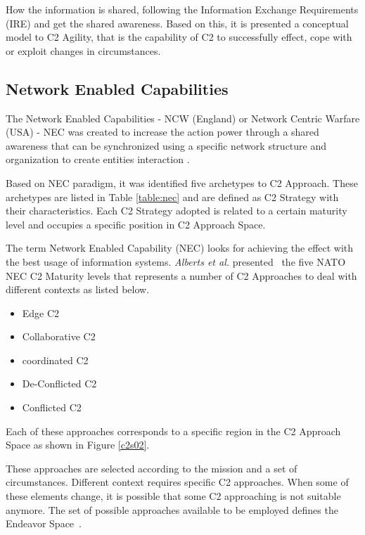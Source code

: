 How the information is shared, following the Information Exchange Requirements (IRE) and get the shared awareness. Based on this, it is presented a conceptual model to C2 Agility, that is the capability of C2 to successfully effect, cope with or exploit changes in circumstances.\cite{ABAR201713} 




\subsection {Network Enabled Capabilities}

The Network Enabled Capabilities - NCW (England) or Network Centric Warfare (USA) - NEC was created to increase the action power through a shared awareness that can be synchronized using a specific network structure and organization to create entities interaction \cite{Alberts2000}. 

Based on NEC paradigm, it was identified five archetypes to C2 Approach. These archetypes are listed in Table \ref{table:nec} and are defined as \gls{C2 Strategy} with their characteristics. Each \gls{C2 Strategy} adopted is related to a certain maturity level and occupies a specific position in C2 Approach Space.



The term Network Enabled Capability (NEC) looks for achieving the effect with the best usage of information systems. \textit{Alberts et al.} presented~\cite{nato01} the five NATO NEC C2 Maturity levels that represents a number of C2 Approaches to deal with different contexts as listed below.

\begin{itemize}
    \item Edge C2
    \item Collaborative C2
    \item coordinated C2
    \item De-Conflicted C2
    \item Conflicted C2
\end{itemize}

Each of these approaches corresponds to a specific region in the C2 Approach Space as shown in Figure \ref{c2s02}.

%

These approaches are selected according to the mission and a set of circumstances. Different context requires specific \gls{C2} approaches. When some of these elements change, it is possible that some C2 approaching is not suitable anymore. The set of possible approaches available to be employed defines the Endeavor Space~\cite{FRANCE2014}.

